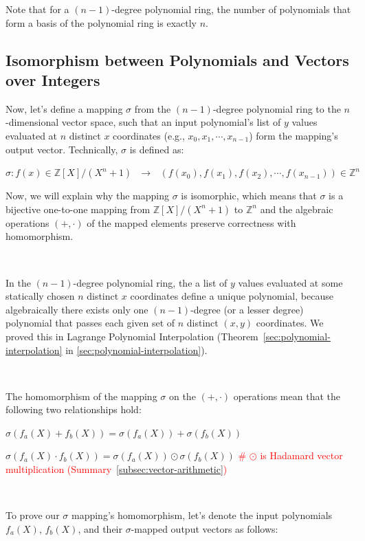 Note that for a $(n-1)$-degree polynomial ring, the number of polynomials that form a basis of the polynomial ring is exactly $n$.


\subsection{Isomorphism between Polynomials and Vectors over Integers}
\label{subsec:poly-vector-transformation}



Now, let's define a mapping $\sigma$ from the $(n-1)$-degree polynomial ring to the $n$-dimensional vector space, such that an input polynomial's list of $y$ values evaluated at $n$ distinct $x$ coordinates (e.g., $x_0, x_1, \cdots, x_{n-1}$) form the mapping's output vector. Technically, $\sigma$ is defined as:

$\sigma: f(x) \in \mathbb{Z}[X] / (X^n + 1) \text{ } \longrightarrow \text{ } (f(x_0), f(x_1), f(x_2), \cdots, f(x_{n-1})) \in \mathbb{Z}^n$

Now, we will explain why the mapping $\sigma$ is isomorphic, which means that $\sigma$ is a bijective one-to-one mapping from $\mathbb{Z}[X] / (X^n + 1)$ to $\mathbb{Z}^n$ and the algebraic operations $(+, \cdot)$ of the mapped elements preserve correctness with homomorphism.

$ $

 In the $(n-1)$-degree polynomial ring, the a list of $y$ values evaluated at some statically chosen $n$ distinct $x$ coordinates define a unique polynomial, because algebraically there exists only one $(n-1)$-degree (or a lesser degree) polynomial that passes each given set of $n$ distinct $(x, y)$ coordinates. We proved this in Lagrange Polynomial Interpolation (Theorem~\ref*{sec:polynomial-interpolation} in \autoref{sec:polynomial-interpolation}). 

$ $

 The homomorphism of the mapping $\sigma$ on the $(+, \cdot)$ operations mean that the following two relationships hold: 

$\sigma(f_a(X) + f_b(X)) = \sigma(f_a(X)) + \sigma(f_b(X))$

$\sigma(f_a(X) \cdot f_b(X)) = \sigma(f_a(X)) \odot \sigma(f_b(X))$ \textcolor{red}{ \text{ } \# $\odot$ is Hadamard vector multiplication (Summary~\ref*{subsec:vector-arithmetic})}

$ $

To prove our $\sigma$ mapping's homomorphism, let's denote the input polynomials $f_a(X)$, $f_b(X)$, and their $\sigma$-mapped output vectors as follows:


